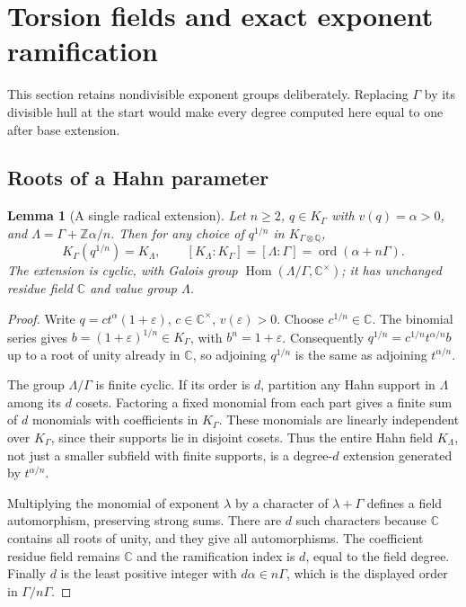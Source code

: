\documentclass[11pt,letterpaper]{article}
\newtheorem{lemma}[lemma]{Lemma}
\theoremstyle{definition}
\newcommand{\C}{\mathbb C}
\newcommand{\Q}{\mathbb Q}
\newcommand{\Z}{\mathbb Z}
\newcommand{\ord}{\operatorname{ord}}
\begin{document}
\section{Torsion fields and exact exponent ramification}\label{tate:sec:torsion}

This section retains nondivisible exponent groups deliberately. Replacing
$\Gamma$ by its divisible hull at the start would make every degree
computed here equal to one after base extension.

\subsection{Roots of a Hahn parameter}

\begin{lemma}[A single radical extension]\label{tate:lem:radical}
Let $n\ge2$, $q\in K_\Gamma$ with $v(q)=\alpha>0$, and
$\Lambda=\Gamma+\Z\alpha/n$. Then for any choice of $q^{1/n}$ in
$K_{\Gamma\otimes\Q}$,
\begin{equation}
 K_\Gamma(q^{1/n})=K_\Lambda,\qquad
 [K_\Lambda:K_\Gamma]=[\Lambda:\Gamma]
       =\ord(\alpha+n\Gamma).\label{tate:eq:radical}
\end{equation}
The extension is cyclic, with Galois group
$\operatorname{Hom}(\Lambda/\Gamma,\C^\times)$; it has unchanged
residue field $\C$ and value group $\Lambda$.
\end{lemma}

\begin{proof}
Write $q=c t^\alpha(1+\varepsilon)$, $c\in\C^\times$, $v(\varepsilon)>0$.
Choose $c^{1/n}\in\C$. The binomial series gives
$b=(1+\varepsilon)^{1/n}\in K_\Gamma$, with $b^n=1+\varepsilon$.
Consequently $q^{1/n}=c^{1/n}t^{\alpha/n}b$ up to a root of unity
already in $\C$, so adjoining $q^{1/n}$ is the same as adjoining
$t^{\alpha/n}$.

The group $\Lambda/\Gamma$ is finite cyclic. If its order is $d$,
partition any Hahn support in $\Lambda$ among its $d$ cosets. Factoring
a fixed monomial from each part gives a finite sum of $d$ monomials
with coefficients in $K_\Gamma$. These monomials are linearly independent
over $K_\Gamma$, since their supports lie in disjoint cosets. Thus the
entire Hahn field $K_\Lambda$, not just a smaller subfield with finite
supports, is a degree-$d$ extension generated by $t^{\alpha/n}$.

Multiplying the monomial of exponent $\lambda$ by a character of
$\lambda+\Gamma$ defines a field automorphism, preserving strong sums.
There are $d$ such characters because $\C$ contains all roots of unity,
and they give all automorphisms. The coefficient residue field remains
$\C$ and the ramification index is $d$, equal to the field degree.
Finally $d$ is the least positive integer with $d\alpha\in n\Gamma$,
which is the displayed order in $\Gamma/n\Gamma$.
\end{proof}
\end{document}
